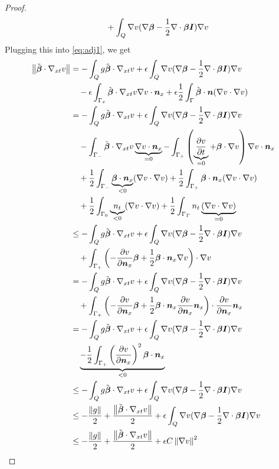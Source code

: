 \documentclass{article}
\begin{document}
\begin{proof}
\begin{align*}
&\quad+\int_Q\nabla v(\nabla\boldsymbol\beta-\frac{1}{2}\nabla\cdot\boldsymbol\beta\boldsymbol I)\nabla v\\
\end{align*}
Plugging this into \eqref{eq:adj1}, we get
\begin{align*}
\norm{\tilde\bfbeta\cdot\Gradxt v}
&=-\int_Q g\tilde\bfbeta\cdot\Gradxt v
+\epsilon\int_Q\Grad v(\Grad\bfbeta-\frac{1}{2}\Div\bfbeta\bfI)\Grad v\\
&\quad-\epsilon\int_{\Gamma_x}\tilde\bfbeta\cdot\Gradxt v\Grad v\cdot\bfn_x
+\epsilon\frac{1}{2}\int_\Gamma\tilde\bfbeta\cdot\bfn(\Grad v\cdot\Grad v)\\
%
&=-\int_Q g\tilde\bfbeta\cdot\Gradxt v
+\epsilon\int_Q\Grad v(\Grad\bfbeta-\frac{1}{2}\Div\bfbeta\bfI)\Grad v\\
&\quad
-\int_{\Gamma_-}\tilde\bfbeta\cdot\Gradxt v\underbrace{\Grad v\cdot\bfn_x}_{=0}
-\int_{\Gamma_+}\LRp{\underbrace{\pd{v}{t}}_{=0}+\bfbeta\cdot\Grad v}\Grad v\cdot\bfn_x\\
&\quad
+\frac{1}{2}\int_{\Gamma_-}\underbrace{\bfbeta\cdot\bfn_x}_{<0}(\Grad v\cdot\Grad v)
+\frac{1}{2}\int_{\Gamma_+}\bfbeta\cdot\bfn_x(\Grad v\cdot\Grad v)\\
&\quad
+\frac{1}{2}\int_{\Gamma_0}\underbrace{n_t}_{<0}(\Grad v\cdot\Grad v)
+\frac{1}{2}\int_{\Gamma_T}n_t\underbrace{(\Grad v\cdot\Grad v)}_{=0}\\
%
&\leq-\int_Q g\tilde\bfbeta\cdot\Gradxt v
+\epsilon\int_Q\Grad v(\Grad\bfbeta-\frac{1}{2}\Div\bfbeta\bfI)\Grad v\\
&\quad
+\int_{\Gamma_+}\LRp{-\pd{v}{\bfn_x}\bfbeta
+\frac{1}{2}\bfbeta\cdot\bfn_x\Grad v}\cdot\Grad v\\
%
&=-\int_Q g\tilde\bfbeta\cdot\Gradxt v
+\epsilon\int_Q\Grad v(\Grad\bfbeta-\frac{1}{2}\Div\bfbeta\bfI)\Grad v\\
&\quad
+\int_{\Gamma_+}\LRp{-\pd{v}{\bfn_x}\bfbeta
+\frac{1}{2}\bfbeta\cdot\bfn_x\pd{v}{\bfn_x}\bfn_x}\cdot\pd{v}{\bfn_x}\bfn_x\\
%
&=-\int_Q g\tilde\bfbeta\cdot\Gradxt v
+\epsilon\int_Q\Grad v(\Grad\bfbeta-\frac{1}{2}\Div\bfbeta\bfI)\Grad v\\
&\quad
\underbrace{-\frac{1}{2}\int_{\Gamma_+}\LRp{\pd{v}{\bfn_x}}^2\bfbeta\cdot\bfn_x}_{<0}\\
%
&\leq-\int_Q g\tilde\bfbeta\cdot\Gradxt v
+\epsilon\int_Q\Grad v(\Grad\bfbeta-\frac{1}{2}\Div\bfbeta\bfI)\Grad v\\
%
&\leq-\frac{\norm{g}}{2}+\frac{\norm{\tilde\bfbeta\cdot\Gradxt v}}{2}
+\epsilon\int_Q\Grad v(\Grad\bfbeta-\frac{1}{2}\Div\bfbeta\bfI)\Grad v\\
%
&\leq-\frac{\norm{g}}{2}+\frac{\norm{\tilde\bfbeta\cdot\Gradxt v}}{2}
+\epsilon C\norm{\Grad v}^2
\end{align*}
\end{proof}
\end{document}
